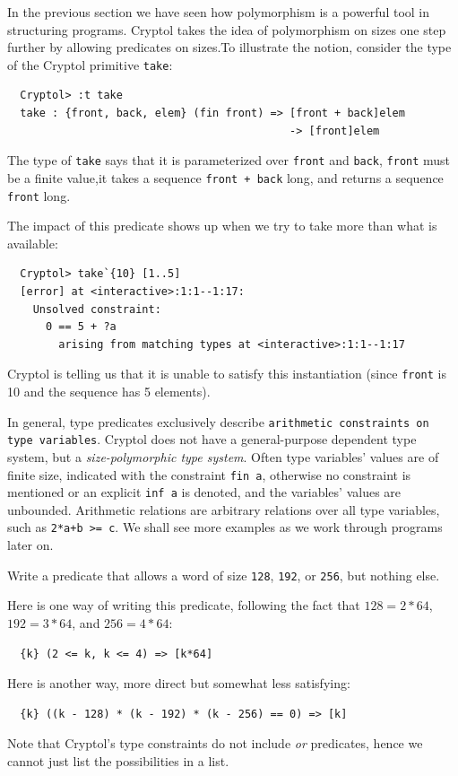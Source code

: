 
In the previous section we have seen how polymorphism is a powerful
tool in structuring programs. Cryptol takes the idea of polymorphism
on sizes one step further by allowing predicates on
sizes.\indPredicates To illustrate the notion, consider the type of
the Cryptol primitive {\tt take}\indTake:
\begin{Verbatim}
  Cryptol> :t take
  take : {front, back, elem} (fin front) => [front + back]elem 
                                            -> [front]elem
\end{Verbatim}

The type of {\tt take} says that it is parameterized over {\tt front}
and {\tt back}, {\tt front} must be a finite value,\indFin it takes a
sequence {\tt front + back} long, and returns a sequence {\tt front} long.

The impact of this predicate shows up when we try to take more than
what is available:
\begin{Verbatim}
  Cryptol> take`{10} [1..5]
  [error] at <interactive>:1:1--1:17:
    Unsolved constraint:
      0 == 5 + ?a
        arising from matching types at <interactive>:1:1--1:17
\end{Verbatim}
Cryptol is telling us that it is unable to satisfy this instantiation
(since {\tt front} is 10 and the sequence has 5
elements).\indTake\indPredicates

In general, type predicates exclusively describe \texttt{arithmetic
  constraints on type variables}.  Cryptol does not have a
general-purpose dependent type system, but a \emph{size-polymorphic
  type system}.  Often type variables' values are of finite size,
indicated with the constraint {\tt fin a}\indFin, otherwise no
constraint is mentioned or an explicit \texttt{inf a} is
denoted\indInf, and the variables' values are unbounded.  Arithmetic
relations are arbitrary relations over all type variables, such as
{\tt 2*a+b >= c}.  We shall see more examples as we work through
programs later on.

\begin{Exercise}\label{ex:preds:1}
  Write a predicate that allows a word of size {\tt 128}, {\tt 192},
  or {\tt 256}, but nothing else.
\end{Exercise}
\begin{Answer}\indPredicates
  Here is one way of writing this predicate, following the fact that
  $128 = 2 * 64$, $192 = 3 * 64$, and $256 = 4 * 64$:
\begin{verbatim}
  {k} (2 <= k, k <= 4) => [k*64]
\end{verbatim}
Here is another way, more direct but somewhat less satisfying:
\begin{verbatim}
  {k} ((k - 128) * (k - 192) * (k - 256) == 0) => [k]
\end{verbatim}
Note that Cryptol's type constraints do not include {\em or} predicates, 
hence we cannot just list the possibilities in a list.
\end{Answer}

